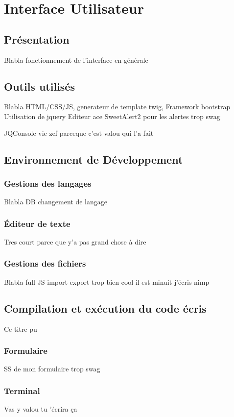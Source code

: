 \chapter{Interface Utilisateur}

\section{Présentation}


Blabla fonctionnement de l'interface en générale

\section{Outils utilisés}

Blabla HTML/CSS/JS, generateur de template twig, Framework bootstrap
Utilisation de jquery
Editeur ace
SweetAlert2 pour les alertes trop swag

JQConsole vie zef parceque c'est valou qui l'a fait

\section{Environnement de Développement}

\subsection{Gestions des langages}
Blabla DB changement de langage

\subsection{Éditeur de texte}
Tres court parce que y'a pas grand chose à dire

\subsection{Gestions des fichiers}
Blabla full JS import export trop bien cool il est minuit j'écris nimp

\section{Compilation et exécution du code écris}
Ce titre pu
\subsection{Formulaire}

SS de mon formulaire trop swag

\subsection{Terminal}

Vas y valou tu 'écrira ça
